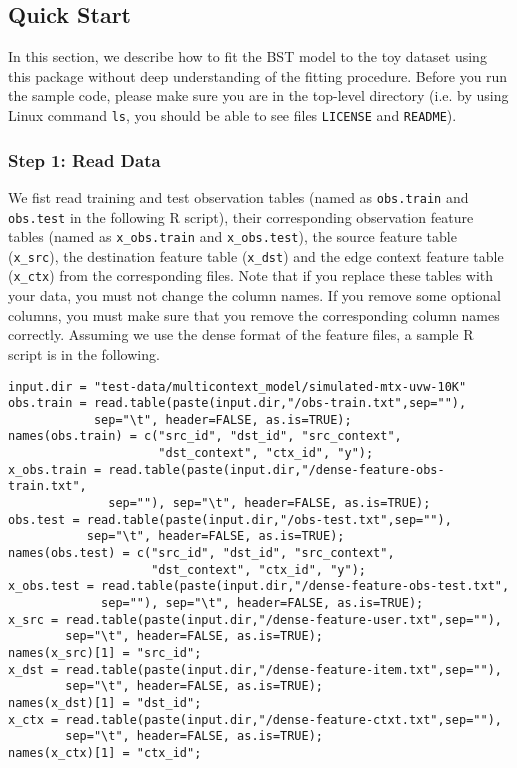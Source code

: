 
\subsection{Quick Start}
\label{sec:bst-quick-start}

In this section, we describe how to fit the BST model to the toy dataset using this package without deep understanding of the fitting procedure.  Before you run the sample code, please make sure you are in the top-level directory (i.e. by using Linux command {\tt ls}, you should be able to see files {\tt LICENSE} and {\tt README}).

\subsubsection{Step 1: Read Data}

We fist read training and test observation tables (named as {\tt obs.train} and {\tt obs.test} in the following R script), their corresponding observation feature tables (named as {\tt x\_obs.train} and {\tt x\_obs.test}), the source feature table ({\tt x\_src}), the destination feature table ({\tt x\_dst}) and the edge context feature table ({\tt x\_ctx}) from the corresponding files.  Note that if you replace these tables with your data, you must not change the column names.  If you remove some optional columns, you must make sure that you remove the corresponding column names correctly. Assuming we use the dense format of the feature files, a sample R script is in the following.
{\small\begin{verbatim}
input.dir = "test-data/multicontext_model/simulated-mtx-uvw-10K"
obs.train = read.table(paste(input.dir,"/obs-train.txt",sep=""), 
            sep="\t", header=FALSE, as.is=TRUE);
names(obs.train) = c("src_id", "dst_id", "src_context", 
                     "dst_context", "ctx_id", "y");
x_obs.train = read.table(paste(input.dir,"/dense-feature-obs-train.txt",
              sep=""), sep="\t", header=FALSE, as.is=TRUE);
obs.test = read.table(paste(input.dir,"/obs-test.txt",sep=""), 
           sep="\t", header=FALSE, as.is=TRUE);
names(obs.test) = c("src_id", "dst_id", "src_context", 
                    "dst_context", "ctx_id", "y");
x_obs.test = read.table(paste(input.dir,"/dense-feature-obs-test.txt",
             sep=""), sep="\t", header=FALSE, as.is=TRUE);
x_src = read.table(paste(input.dir,"/dense-feature-user.txt",sep=""),
        sep="\t", header=FALSE, as.is=TRUE);
names(x_src)[1] = "src_id";
x_dst = read.table(paste(input.dir,"/dense-feature-item.txt",sep=""),
        sep="\t", header=FALSE, as.is=TRUE);
names(x_dst)[1] = "dst_id";
x_ctx = read.table(paste(input.dir,"/dense-feature-ctxt.txt",sep=""),
        sep="\t", header=FALSE, as.is=TRUE);
names(x_ctx)[1] = "ctx_id";
\end{verbatim}}

